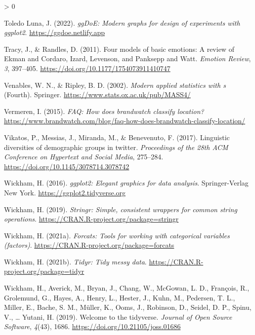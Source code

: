 \documentclass[
  english,
  jou,floatsintext]{apa7}
\newlength{\cslhangindent}
\newenvironment{CSLReferences}[2] %
 {%
  \setlength{\parindent}{0pt}
  \ifodd #1 \everypar{\setlength{\hangindent}{\cslhangindent}}\ignorespaces\fi
  \ifnum #2 > 0
  \setlength{\parskip}{#2\baselineskip}
  \fi
 }%
 {}
\begin{document}
\begin{CSLReferences}{1}{0}
\leavevmode\hypertarget{ref-R-ggDoE}{}%
Toledo Luna, J. (2022). \emph{ggDoE: Modern graphs for design of experiments with ggplot2}. \url{https://ggdoe.netlify.app}

\leavevmode\hypertarget{ref-Tracy2011}{}%
Tracy, J., \& Randles, D. (2011). Four models of basic emotions: A review of {Ekman} and {Cordaro}, {Izard}, {Levenson}, and {Panksepp} and {Watt}. \emph{Emotion Review}, \emph{3}, 397--405. \url{https://doi.org/10.1177/1754073911410747}

\leavevmode\hypertarget{ref-R-MASS}{}%
Venables, W. N., \& Ripley, B. D. (2002). \emph{Modern applied statistics with s} (Fourth). Springer. \url{https://www.stats.ox.ac.uk/pub/MASS4/}

\leavevmode\hypertarget{ref-vermeren_2015}{}%
Vermeren, I. (2015). \emph{FAQ: How does brandwatch classify location?} \url{https://www.brandwatch.com/blog/faq-how-does-brandwatch-classify-location/}

\leavevmode\hypertarget{ref-Vikatos2017}{}%
Vikatos, P., Messias, J., Miranda, M., \& Benevenuto, F. (2017). Linguistic diversities of demographic groups in twitter. \emph{Proceedings of the 28th ACM Conference on Hypertext and Social Media}, 275--284. \url{https://doi.org/10.1145/3078714.3078742}

\leavevmode\hypertarget{ref-R-ggplot2}{}%
Wickham, H. (2016). \emph{ggplot2: Elegant graphics for data analysis}. Springer-Verlag New York. \url{https://ggplot2.tidyverse.org}

\leavevmode\hypertarget{ref-R-stringr}{}%
Wickham, H. (2019). \emph{Stringr: Simple, consistent wrappers for common string operations}. \url{https://CRAN.R-project.org/package=stringr}

\leavevmode\hypertarget{ref-R-forcats}{}%
Wickham, H. (2021a). \emph{Forcats: Tools for working with categorical variables (factors)}. \url{https://CRAN.R-project.org/package=forcats}

\leavevmode\hypertarget{ref-R-tidyr}{}%
Wickham, H. (2021b). \emph{Tidyr: Tidy messy data}. \url{https://CRAN.R-project.org/package=tidyr}

\leavevmode\hypertarget{ref-R-tidyverse}{}%
Wickham, H., Averick, M., Bryan, J., Chang, W., McGowan, L. D., François, R., Grolemund, G., Hayes, A., Henry, L., Hester, J., Kuhn, M., Pedersen, T. L., Miller, E., Bache, S. M., Müller, K., Ooms, J., Robinson, D., Seidel, D. P., Spinu, V., \ldots{} Yutani, H. (2019). Welcome to the {tidyverse}. \emph{Journal of Open Source Software}, \emph{4}(43), 1686. \url{https://doi.org/10.21105/joss.01686}


\end{CSLReferences}
\end{document}
